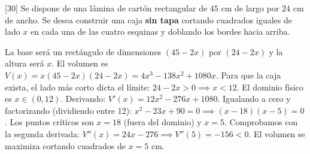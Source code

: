 \documentclass[11pt,paper=a4,answers, addpoints]{exam}
\begin{document}
\begin{questions}

[30]
Se dispone de una lámina de cartón rectangular de $45 \text{ cm}$ de largo por $24 \text{ cm}$ de ancho. Se desea construir una caja \textbf{sin tapa} cortando cuadrados iguales de lado $x$ en cada una de las cuatro esquinas y doblando los bordes hacia arriba.

\begin{center}
\end{center}

\begin{solution}
La base será un rectángulo de dimensiones $(45-2x)$ por $(24-2x)$ y la altura será $x$. El volumen es $V(x) = x(45-2x)(24-2x) = 4x^3 - 138x^2 + 1080x$. Para que la caja exista, el lado más corto dicta el límite: $24-2x > 0 \implies x < 12$. El dominio físico es $x \in (0, 12)$.
Derivando: $V'(x) = 12x^2 - 276x + 1080$. Igualando a cero y factorizando (dividiendo entre 12): $x^2 - 23x + 90 = 0 \implies (x-18)(x-5) = 0$. Los puntos críticos son $x=18$ (fuera del dominio) y $x=5$. Comprobamos con la segunda derivada: $V''(x) = 24x - 276 \implies V''(5) = -156 < 0$. El volumen se maximiza cortando cuadrados de $x = 5 \text{ cm}$.
\end{solution}


\end{questions}
\end{document}
